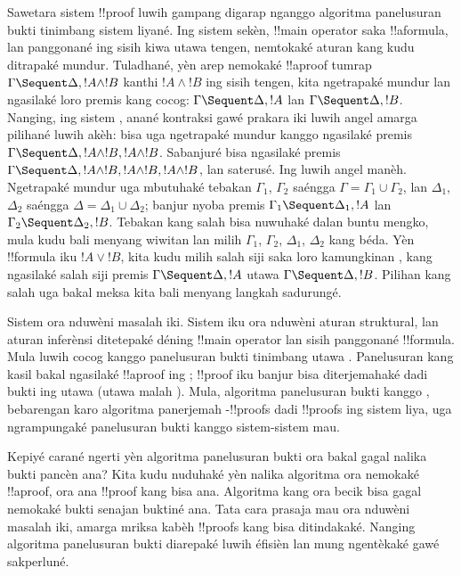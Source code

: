 \documentclass[../../../include/open-logic-section]{subfiles}
\begin{document}
Sawetara sistem !!{proof} luwih gampang digarap nganggo
algoritma panelusuran bukti tinimbang sistem liyané.
Ing sistem sekèn, !!{main operator} saka
!!a{formula}, lan panggonané ing sisih kiwa utawa
tengen, nemtokaké aturan kang kudu ditrapaké mundur.
Tuladhané, yèn arep nemokaké !!a{proof} tumrap
$\Gamma \Sequent \Delta, !A \land !B$ kanthi
$!A \land !B$ ing sisih tengen, kita ngetrapaké
\RightR{\land} mundur lan ngasilaké loro premis kang
cocog: $\Gamma \Sequent \Delta, !A$ lan
$\Gamma \Sequent \Delta, !B$. Nanging, ing sistem
, anané kontraksi gawé prakara iki luwih
angel amarga pilihané luwih akèh: bisa uga ngetrapaké
\RightR{\Contraction} mundur kanggo ngasilaké premis
$\Gamma \Sequent \Delta, !A \land !B, !A \land !B$.
Sabanjuré bisa ngasilaké premis
$\Gamma \Sequent \Delta, !A \land !B, !A \land !B, !A \land !B$,
lan saterusé. Ing  luwih angel manèh.
Ngetrapaké \RightR{\land} mundur uga mbutuhaké tebakan
$\Gamma_1$, $\Gamma_2$ saéngga
$\Gamma = \Gamma_1 \cup \Gamma_2$, lan
$\Delta_1$, $\Delta_2$ saéngga
$\Delta = \Delta_1 \cup \Delta_2$; banjur nyoba premis
$\Gamma_1 \Sequent \Delta_1, !A$ lan
$\Gamma_2 \Sequent \Delta_2, !B$. Tebakan kang salah
bisa nuwuhaké dalan buntu mengko, mula kudu bali menyang
wiwitan lan milih $\Gamma_1$, $\Gamma_2$,
$\Delta_1$, $\Delta_2$ kang béda. Yèn !!{formula}
iku $!A \lor !B$, kita kudu milih salah siji saka
loro kamungkinan \RightR{\lor}, kang ngasilaké
salah siji premis $\Gamma \Sequent \Delta, !A$ utawa
$\Gamma \Sequent \Delta, !B$. Pilihan kang salah
uga bakal meksa kita bali menyang langkah sadurungé.

Sistem  ora nduwèni masalah iki. Sistem iku
ora nduwèni aturan struktural, lan aturan inferènsi
ditetepaké déning !!{main operator} lan sisih
panggonané !!{formula}. Mula  luwih cocog
kanggo panelusuran bukti tinimbang  utawa
. Panelusuran kang kasil bakal ngasilaké
!!a{proof} ing ; !!{proof} iku banjur bisa
diterjemahaké dadi bukti ing  utawa
 (utawa malah ). Mula, algoritma
panelusuran bukti kanggo , bebarengan karo
algoritma panerjemah -!!{proof}s dadi
!!{proof}s ing sistem liya, uga ngrampungaké
panelusuran bukti kanggo sistem-sistem mau.

Kepiyé carané ngerti yèn algoritma panelusuran bukti
ora bakal gagal nalika bukti pancèn ana? Kita kudu
nuduhaké yèn nalika algoritma ora nemokaké
!!a{proof}, ora ana !!{proof} kang bisa ana.
Algoritma kang ora becik bisa gagal nemokaké bukti
senajan buktiné ana. Tata cara prasaja mau ora nduwèni
masalah iki, amarga mriksa kabèh !!{proof}s kang bisa ditindakaké.
Nanging algoritma panelusuran bukti diarepaké luwih
éfisièn lan mung ngentèkaké gawé sakperluné.
\end{document}
